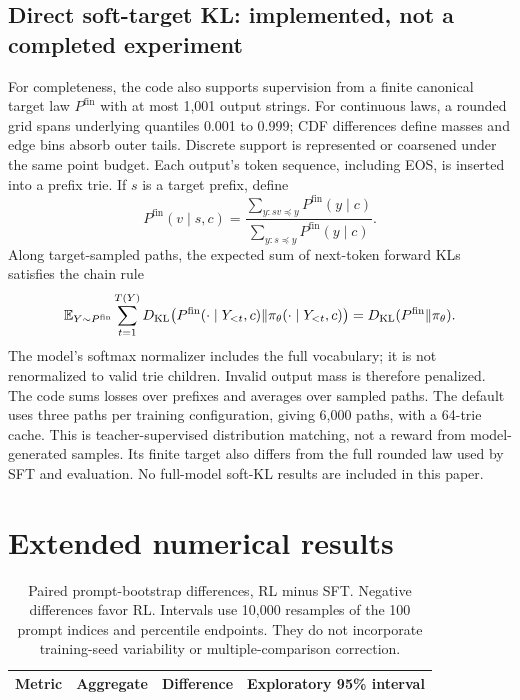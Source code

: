 \subsection{Direct soft-target KL: implemented, not a completed experiment}
For completeness, the code also supports supervision from a finite
canonical target law $P^{\mathrm{fin}}$ with at most 1,001 output strings.
For continuous laws, a rounded grid spans underlying quantiles 0.001 to
0.999; CDF differences define masses and edge bins absorb outer tails.
Discrete support is represented or coarsened under the same point budget.
Each output's token sequence, including EOS, is inserted into a prefix
trie. If $s$ is a target prefix, define
\begin{equation}
 P^{\mathrm{fin}}(v\mid s,c)=
 \frac{\sum_{y:sv\preceq y}P^{\mathrm{fin}}(y\mid c)}
      {\sum_{y:s\preceq y}P^{\mathrm{fin}}(y\mid c)}.
\end{equation}
Along target-sampled paths, the expected sum of next-token forward KLs
satisfies the chain rule
\begin{equation}
 \mathbb{E}_{Y\sim P^{\mathrm{fin}}}\sum_{t=1}^{T(Y)}
 D_{\mathrm{KL}}\!\left(P^{\mathrm{fin}}(\cdot\mid Y_{<t},c)
          \Vert\pi_\theta(\cdot\mid Y_{<t},c)\right)
 =D_{\mathrm{KL}}(P^{\mathrm{fin}}\Vert\pi_\theta).
\end{equation}
The model's softmax normalizer includes the full vocabulary; it is not
renormalized to valid trie children. Invalid output mass is therefore
penalized. The code sums losses over prefixes and averages over sampled
paths. The default uses three paths per training configuration, giving
6,000 paths, with a 64-trie cache. This is teacher-supervised distribution
matching, not a reward from model-generated samples. Its finite target
also differs from the full rounded law used by SFT and evaluation. No
full-model soft-KL results are included in this paper.

\section{Extended numerical results}
\label{app:extended}
\begin{table}[htbp]
\centering\small
\caption{Paired prompt-bootstrap differences, RL minus SFT. Negative
differences favor RL. Intervals use 10,000 resamples of the 100 prompt
indices and percentile endpoints. They do not incorporate training-seed
variability or multiple-comparison correction.}
\begin{tabular}{@{}llrr@{}}
\toprule
Metric & Aggregate & Difference & Exploratory 95\% interval\\
\midrule

\end{tabular}
\end{table}

